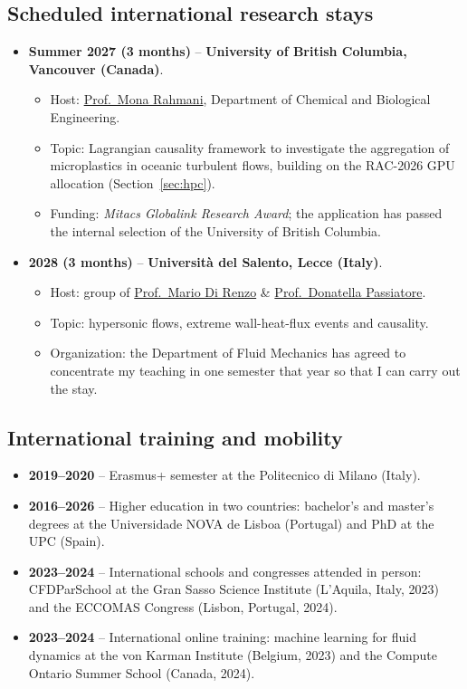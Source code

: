 \documentclass[11pt]{article}
\begin{document}
\subsection{Scheduled international research stays}\label{sec:stays-sched}
\begin{itemize}
  \item \textbf{Summer 2027 (3 months)} -- \textbf{University of British
  Columbia, Vancouver (Canada)}.
  \begin{itemize}
    \item Host: \href{https://chbe.ubc.ca/mona-rahmani/}{Prof.\ Mona Rahmani},
    Department of Chemical and Biological Engineering.
    \item Topic: Lagrangian causality framework to investigate the aggregation of
    microplastics in oceanic turbulent flows, building on the RAC-2026 GPU allocation (Section~\ref{sec:hpc}).
    \item Funding: \emph{Mitacs Globalink Research Award}; the application has
    passed the internal selection of the University of British Columbia.
  \end{itemize}
  \item \textbf{2028 (3 months)} -- \textbf{Universit\`a del Salento, Lecce
  (Italy)}.
  \begin{itemize}
    \item Host: group of
    \href{https://www.unisalento.it/scheda-utente/-/people/mario.direnzo}{Prof.\ Mario Di Renzo} \& \href{https://www.unisalento.it/scheda-utente/-/people/donatella.passiatore}{Prof.\ Donatella Passiatore}.
    \item Topic: hypersonic flows, extreme wall-heat-flux events and causality.
    \item Organization: the Department of Fluid Mechanics has agreed to concentrate
    my teaching in one semester that year so that I can carry out the stay.
  \end{itemize}
\end{itemize}

\subsection{International training and mobility}
\begin{itemize}
  \item \textbf{2019--2020} -- Erasmus+ semester at the Politecnico di Milano (Italy).
  \item \textbf{2016--2026} -- Higher education in two countries: bachelor's and master's
  degrees at the Universidade NOVA de Lisboa (Portugal) and PhD at the UPC (Spain).
  \item \textbf{2023--2024} -- International schools and congresses attended in person:
  CFDParSchool at the Gran Sasso Science Institute (L'Aquila, Italy, 2023) and the ECCOMAS
  Congress (Lisbon, Portugal, 2024).
  \item \textbf{2023--2024} -- International online training: machine learning for fluid
  dynamics at the von Karman Institute (Belgium, 2023) and the Compute Ontario Summer School
  (Canada, 2024).
\end{itemize}
\end{document}
